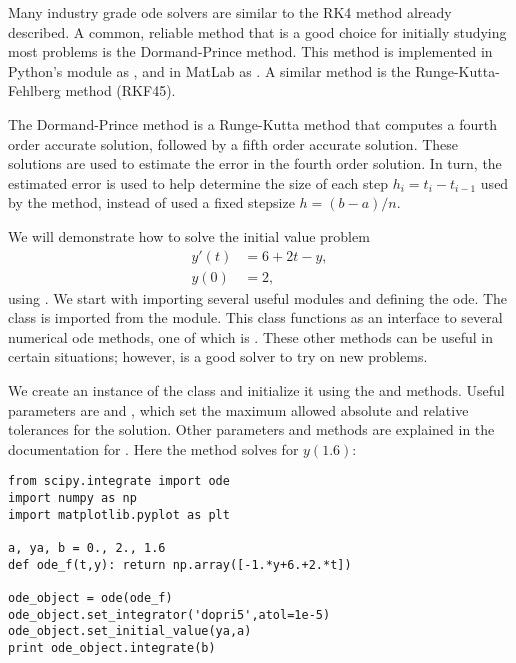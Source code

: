 \label{lab:ZombieApocalypse}

Many industry grade ode solvers are similar to the RK4 method already described. A common, reliable method that is a good choice for initially studying most problems is the Dormand-Prince method. This method is implemented in Python's  module as , and in MatLab as . A similar method is the Runge-Kutta-Fehlberg method (RKF45). 

The Dormand-Prince method is a Runge-Kutta method that computes a fourth order accurate solution, followed by a fifth order accurate solution. These solutions are used to estimate the error in the fourth order solution. In turn, the estimated error is used to help determine the size of each step $h_i = t_i-t_{i-1}$ used by the method, instead of used a fixed stepsize $h = (b-a)/n$. 

We will demonstrate how to solve the initial value problem
\begin{align*}
y'(t) &= 6+2t-y, \\
y(0) &= 2,
\end{align*}
using . We start with importing several useful modules and defining the ode. 
The  class is imported from the  module. 
This class functions as an interface to several numerical ode methods, one of which is . 
These other methods can be useful in certain situations; however,  is a good solver to try on new problems. 



We create an instance of the  class and initialize it using the  and  methods. 
Useful parameters are  and , which set the maximum allowed absolute and relative tolerances for the solution. 
Other parameters and methods are explained in the documentation for .  
Here the method solves for $y(1.6)$:

\begin{lstlisting}
from scipy.integrate import ode
import numpy as np
import matplotlib.pyplot as plt

a, ya, b = 0., 2., 1.6
def ode_f(t,y): return np.array([-1.*y+6.+2.*t])

ode_object = ode(ode_f)
ode_object.set_integrator('dopri5',atol=1e-5) 
ode_object.set_initial_value(ya,a) 
print ode_object.integrate(b)
\end{lstlisting}

